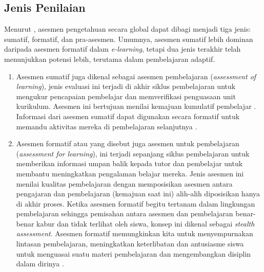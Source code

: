\subsection{Jenis Penilaian}
Menurut \textcite{Ihichr2024}, asesmen pengetahuan secara global dapat dibagi menjadi
tiga jenis: sumatif, formatif, dan pra-asesmen. Umumnya, asesmen sumatif lebih
dominan daripada asesmen formatif dalam \textit{e-learning}, tetapi dua jenis
terakhir telah menunjukkan potensi lebih, terutama dalam pembelajaran adaptif.


\begin{enumerate}
    \item Asesmen sumatif juga dikenal sebagai asesmen pembelajaran (\textit{assessment of
    learning}), jenis evaluasi ini terjadi di akhir siklus pembelajaran untuk mengukur
    pencapaian pembelajar dan memverifikasi penguasaan unit kurikulum. Asesmen ini
    bertujuan menilai kemajuan kumulatif pembelajar \autocite{Ihichr2024}. Informasi
    dari asesmen sumatif dapat digunakan secara formatif untuk memandu aktivitas
    mereka di pembelajaran selanjutnya \autocite{Minn2022}.

    \item Asesmen formatif atau yang disebut juga asesmen untuk pembelajaran
    (\textit{assessment for learning}), ini terjadi sepanjang siklus pembelajaran
    untuk memberikan informasi umpan balik kepada tutor dan pembelajar untuk membantu
    meningkatkan pengalaman belajar mereka. Jenis asesmen ini menilai kualitas
    pembelajaran dengan memposisikan asesmen antara pengajaran dan pembelajaran
    (kemajuan saat ini) alih-alih diposisikan hanya di akhir proses. Ketika asesmen
    formatif begitu tertanam dalam lingkungan pembelajaran sehingga pemisahan antara
    asesmen dan pembelajaran benar-benar kabur dan tidak terlihat oleh siswa, konsep
    ini dikenal sebagai \textit{stealth assessment}. Asesmen formatif memungkinkan kita
    untuk menyempurnakan lintasan pembelajaran, meningkatkan keterlibatan dan antusiasme
    siswa untuk menguasai suatu materi pembelajaran dan mengembangkan disiplin dalam
    dirinya \autocite{Ihichr2024}.
    

\end{enumerate}

